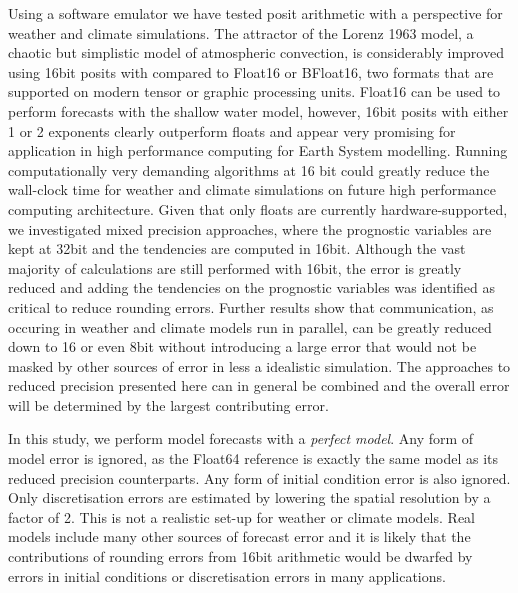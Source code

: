 \documentclass[draft]{agujournal2019}
\begin{document}
Using a software emulator we have tested posit arithmetic with a perspective for weather and climate simulations. The attractor of the Lorenz 1963 model, a chaotic but simplistic model of atmospheric convection, is considerably improved using 16bit posits with compared to Float16 or BFloat16, two formats that are supported on modern tensor or graphic processing units. Float16 can be used to perform forecasts with the shallow water model, however, 16bit posits with either 1 or 2 exponents clearly outperform floats and appear very promising for application in high performance computing for Earth System modelling. Running computationally very demanding algorithms at 16 bit could greatly reduce the wall-clock time for weather and climate simulations on future high performance computing architecture. Given that only floats are currently hardware-supported, we investigated mixed precision approaches, where the prognostic variables are kept at 32bit and the tendencies are computed in 16bit. Although the vast majority of calculations are still performed with 16bit, the error is greatly reduced and adding the tendencies on the prognostic variables was identified as critical to reduce rounding errors. Further results show that communication, as occuring in weather and climate models run in parallel, can be greatly reduced down to 16 or even 8bit without introducing a large error that would not be masked by other sources of error in less a idealistic simulation. The approaches to reduced precision presented here can in general be combined and the overall error will be determined by the largest contributing error.

In this study, we perform model forecasts with a \emph{perfect model}. Any form of model error is ignored, as the Float64 reference is exactly the same model as its reduced precision counterparts. Any form of initial condition error is also ignored. Only discretisation errors are estimated by lowering the spatial resolution by a factor of 2. This is not a realistic set-up for weather or climate models. Real models include many other sources of forecast error and it is likely that the contributions of rounding errors from 16bit arithmetic would be dwarfed by errors in initial conditions or discretisation errors in many applications. 
\end{document}
